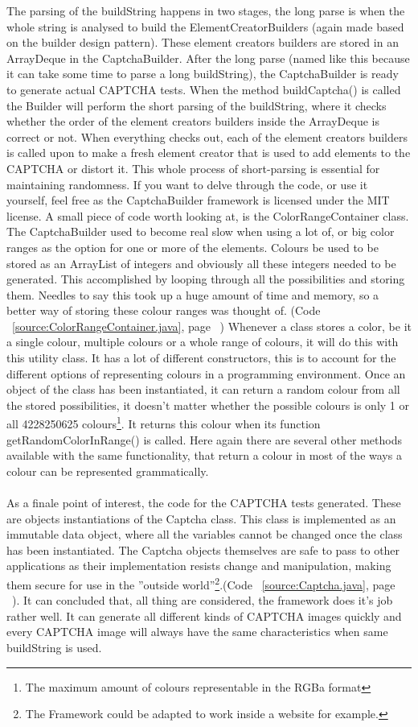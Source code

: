\documentclass[pdftex,a4paper,12pt,twoside]{report}
\theoremstyle{plain} \newtheorem{theorem}{Theorem} \newtheorem{proposition}{Proposition} \newtheorem{lemma}{Lemma} \newtheorem*{corollary}{Corollary}
\theoremstyle{definition} \newtheorem{definition}{Definition} \newtheorem{conjecture}{Conjecture} \newtheorem*{example}{Example} \newtheorem{algorithm}{Algorithm}
\theoremstyle{remark} \newtheorem*{remark}{Remark} \newtheorem*{note}{Note} \newtheorem{case}{Case}
\begin{document}
The parsing of the buildString happens in two stages, the long parse is when the whole string is analysed to build the ElementCreatorBuilders (again made based on the builder design pattern). These element creators builders are stored in an ArrayDeque in the CaptchaBuilder. After the long parse (named like this because it can take some time to parse a long buildString), the CaptchaBuilder is ready to generate actual CAPTCHA tests. When the method buildCaptcha() is called the Builder will perform the short parsing of the buildString, where it checks whether the order of the element creators builders inside the ArrayDeque is correct or not. When everything checks out, each of the element creators builders is called upon to make a fresh element creator that is used to add elements to the CAPTCHA or distort it. This whole process of short-parsing is essential for maintaining randomness. If you want to delve through the code, or use it yourself, feel free as the CaptchaBuilder framework is licensed under the MIT license. A small piece of code worth looking at, is the ColorRangeContainer class. The CaptchaBuilder used to become real slow when using a lot of, or big color ranges as the option for one or more of the elements. Colours be used to be stored as an ArrayList of integers and obviously all these integers needed to be generated. This accomplished by looping through all the possibilities and storing them. Needles to say this took up a huge amount of time and memory, so a better way of storing these colour ranges was thought of. (Code ~\ref{source:ColorRangeContainer.java}, page ~\pageref{source:ColorRangeContainer.java})
Whenever a class stores a color, be it a single colour, multiple colours or a whole range of colours, it will do this with this utility class. It has a lot of different constructors, this is to account for the different options of representing colours in a programming environment. Once an object of the class has been instantiated, it can return a random colour from all the stored possibilities, it doesn't matter whether the possible colours is only 1 or all 4228250625 colours\footnote{The maximum amount of colours representable in the RGBa format}. It returns this colour when its function getRandomColorInRange() is called. Here again there are several other methods available with the same functionality, that return a colour in most of the ways a colour can be represented grammatically.\\\\
As a finale point of interest, the code for the CAPTCHA tests generated. These are objects instantiations of the Captcha class. This class is implemented as an immutable data object, where all the variables cannot be changed once the class has been instantiated. The Captcha objects themselves are safe to pass to other applications as their implementation resists change and manipulation, making them secure for use in the ''outside world''\footnote{The Framework could be adapted to work inside a website for example.}.(Code ~\ref{source:Captcha.java}, page ~\pageref{source:Captcha.java}). It can concluded that, all thing are considered, the framework does it's job rather well. It can generate all different kinds of CAPTCHA images quickly and every CAPTCHA image will always have the same characteristics when same buildString is used.
\end{document}
